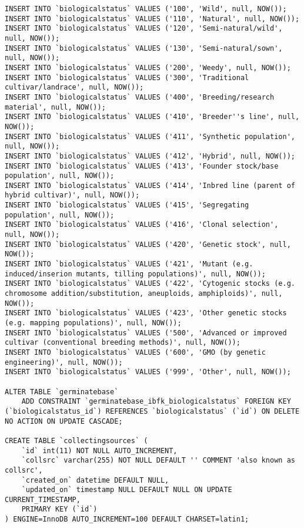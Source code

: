 \begin{itemize}
\begin{lstlisting}[style=SQL]
INSERT INTO `biologicalstatus` VALUES ('100', 'Wild', null, NOW());
INSERT INTO `biologicalstatus` VALUES ('110', 'Natural', null, NOW());
INSERT INTO `biologicalstatus` VALUES ('120', 'Semi-natural/wild', null, NOW());
INSERT INTO `biologicalstatus` VALUES ('130', 'Semi-natural/sown', null, NOW());
INSERT INTO `biologicalstatus` VALUES ('200', 'Weedy', null, NOW());
INSERT INTO `biologicalstatus` VALUES ('300', 'Traditional cultivar/landrace', null, NOW());
INSERT INTO `biologicalstatus` VALUES ('400', 'Breeding/research material', null, NOW());
INSERT INTO `biologicalstatus` VALUES ('410', 'Breeder''s line', null, NOW());
INSERT INTO `biologicalstatus` VALUES ('411', 'Synthetic population', null, NOW());
INSERT INTO `biologicalstatus` VALUES ('412', 'Hybrid', null, NOW());
INSERT INTO `biologicalstatus` VALUES ('413', 'Founder stock/base population', null, NOW());
INSERT INTO `biologicalstatus` VALUES ('414', 'Inbred line (parent of hybrid cultivar)', null, NOW());
INSERT INTO `biologicalstatus` VALUES ('415', 'Segregating population', null, NOW());
INSERT INTO `biologicalstatus` VALUES ('416', 'Clonal selection', null, NOW());
INSERT INTO `biologicalstatus` VALUES ('420', 'Genetic stock', null, NOW());
INSERT INTO `biologicalstatus` VALUES ('421', 'Mutant (e.g. induced/inserion mutants, tilling populations)', null, NOW());
INSERT INTO `biologicalstatus` VALUES ('422', 'Cytogenic stocks (e.g. chromosome addition/substitution, aneuploids, amphiploids)', null, NOW());
INSERT INTO `biologicalstatus` VALUES ('423', 'Other genetic stocks (e.g. mapping populations)', null, NOW());
INSERT INTO `biologicalstatus` VALUES ('500', 'Advanced or improved cultivar (conventional breeding methods)', null, NOW());
INSERT INTO `biologicalstatus` VALUES ('600', 'GMO (by genetic engineering)', null, NOW());
INSERT INTO `biologicalstatus` VALUES ('999', 'Other', null, NOW());

ALTER TABLE `germinatebase`
	ADD CONSTRAINT `germinatebase_ibfk_biologicalstatus` FOREIGN KEY (`biologicalstatus_id`) REFERENCES `biologicalstatus` (`id`) ON DELETE NO ACTION ON UPDATE CASCADE;

CREATE TABLE `collectingsources` (
	`id` int(11) NOT NULL AUTO_INCREMENT,
	`collsrc` varchar(255) NOT NULL DEFAULT '' COMMENT 'also known as collsrc',
	`created_on` datetime DEFAULT NULL,
	`updated_on` timestamp NULL DEFAULT NULL ON UPDATE CURRENT_TIMESTAMP,
	PRIMARY KEY (`id`)
) ENGINE=InnoDB AUTO_INCREMENT=100 DEFAULT CHARSET=latin1;


\end{lstlisting}
\end{itemize}
